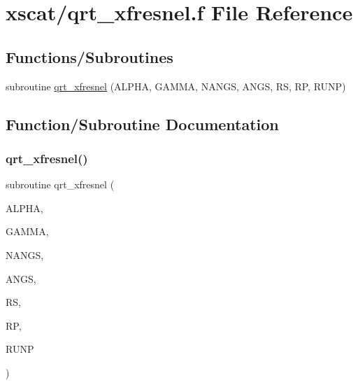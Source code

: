 \hypertarget{qrt__xfresnel_8f}{}\section{xscat/qrt\+\_\+xfresnel.f File Reference}
\label{qrt__xfresnel_8f}
\subsection*{Functions/\+Subroutines}
\begin{DoxyCompactItemize}
\item 
subroutine \hyperlink{qrt__xfresnel_8f_ab9185e70575e889d779d170e27303586}{qrt\+\_\+xfresnel} (A\+L\+P\+HA, G\+A\+M\+MA, N\+A\+N\+GS, A\+N\+GS, RS, RP, R\+U\+NP)
\end{DoxyCompactItemize}


\subsection{Function/\+Subroutine Documentation}
\mbox{\label{qrt__xfresnel_8f_ab9185e70575e889d779d170e27303586}} 
\subsubsection{\texorpdfstring{qrt\+\_\+xfresnel()}{qrt\_xfresnel()}}
{\footnotesize\ttfamily subroutine qrt\+\_\+xfresnel (\begin{DoxyParamCaption}\item[{double precision}]{A\+L\+P\+HA,  }\item[{double precision}]{G\+A\+M\+MA,  }\item[{integer}]{N\+A\+N\+GS,  }\item[{double precision, dimension(nangs)}]{A\+N\+GS,  }\item[{double precision, dimension(nangs)}]{RS,  }\item[{double precision, dimension(nangs)}]{RP,  }\item[{double precision, dimension(nangs)}]{R\+U\+NP }\end{DoxyParamCaption})}

